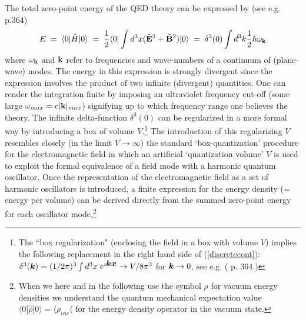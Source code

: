 \documentclass[12pt]{article}
\newcommand{\BFACE}[1] {\mbox{\boldmath $#1$} }
\begin{document}
The total zero-point energy of the QED theory can be expressed by
(see e.g. \cite{milonni94} p.364)
\begin{equation} \label{discretecont}
E \;=  \; \langle 0| \hat{H} | 0 \rangle  \; =\; 
\frac{1}{2}\langle 0|\int d^3 x({\hat{\bf E}}^2 + {\hat{\bf
B}}^2)|0 \rangle  \;
= \; \delta^{3} (0) \int d^3 k \frac{1}{2} \hbar \omega_{\bf k}
\end{equation}
where $\omega_{\bf k}$ and ${\bf k}$ refer to frequencies and
wave-numbers of a continuum of (plane-wave) modes. The energy in
this expression is strongly divergent since the expression
involves the product of two infinite (divergent) quantities. One
can render the integration finite by imposing an ultraviolet
frequency cut-off (some large $\omega_{max}=c|{\bf{k}}|_{max}$)
signifying up to which frequency range one believes the theory.
The infinite delta-function $\delta^3 (0)$ can be regularized in a
more formal way by introducing a box of volume $V$.\footnote{The
``box regularization" (enclosing the field in a box with volume
$V$) implies the following replacement in the right hand side of
(\ref{discretecont}): $ \delta^3 (\BFACE{k}) = (1/2\pi)^3 \int d^3
x \; e^{i \BFACE{k} \BFACE{x}} \rightarrow V/8 \pi^3 $ for
$\BFACE{k} \rightarrow 0$, see e.g. (\cite{milonni94} p. 364.)}
The introduction of this regularizing $V$ resembles closely (in
the limit $V \rightarrow \infty$) the standard `box-quantization'
procedure for the electromagnetic field in which an artificial
`quantization volume' $V$ is used to exploit the formal
equivalence of a field mode with a harmonic quantum oscillator.
Once the representation of the electromagnetic field as a set of
harmonic oscillators is introduced, a finite expression for the
energy density (= energy per volume) can be derived directly from
the summed zero-point energy for each oscillator
mode,\footnote{When we here and in the following use the symbol
$\rho$ for vacuum energy densities we understand the quantum
mechanical expectation value $\langle 0|\hat{\rho}|0 \rangle =\langle \rho _{vac}\langle$ for
the energy density operator in the vacuum state.}
\end{document}
